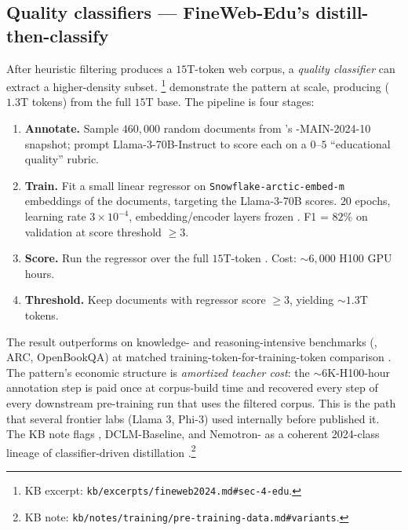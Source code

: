 \subsection{Quality classifiers --- FineWeb-Edu's distill-then-classify}
\label{sec:data-edu}

After heuristic filtering produces a $15$T-token web corpus, a
\emph{quality classifier} can extract a higher-density subset.
\citet[\S 4]{fineweb2024}\footnote{KB excerpt:
\nolinkurl{kb/excerpts/fineweb2024.md#sec-4-edu}.} demonstrate the
pattern at scale, producing  ($1.3$T tokens) from the full
$15$T base. The pipeline is four stages:

\begin{enumerate}
\item \textbf{Annotate.} Sample $460{,}000$ random documents from
's -MAIN-2024-10 snapshot; prompt Llama-3-70B-Instruct to
score each on a $0$--$5$ ``educational quality'' rubric.
\item \textbf{Train.} Fit a small linear regressor on
\texttt{Snowflake-arctic-embed-m} embeddings of the documents,
targeting the Llama-3-70B scores. $20$ epochs, learning rate
$3 \times 10^{-4}$, embedding/encoder layers frozen
\citep[\S 4]{fineweb2024}. F1 = $82\%$ on validation at score
threshold $\geq 3$.
\item \textbf{Score.} Run the regressor over the full $15$T-token
. Cost: $\sim 6{,}000$ H100 GPU hours.
\item \textbf{Threshold.} Keep documents with regressor score
$\geq 3$, yielding $\sim 1.3$T tokens.
\end{enumerate}

The result outperforms  on knowledge- and reasoning-intensive
benchmarks (, ARC, OpenBookQA) at matched
training-token-for-training-token comparison
\citep[abstract]{fineweb2024}. The pattern's economic structure is
\emph{amortized teacher cost}: the $\sim 6$K-H100-hour annotation
step is paid once at corpus-build time and recovered every step of
every downstream pre-training run that uses the filtered corpus.
This is the path that several frontier labs (Llama 3, Phi-3) used
internally before  published it. The KB note flags , DCLM-Baseline, and
Nemotron- as a coherent 2024-class lineage of classifier-driven
distillation \citep[\S
1]{fineweb2024}.\footnote{KB note:
\nolinkurl{kb/notes/training/pre-training-data.md#variants}.}

